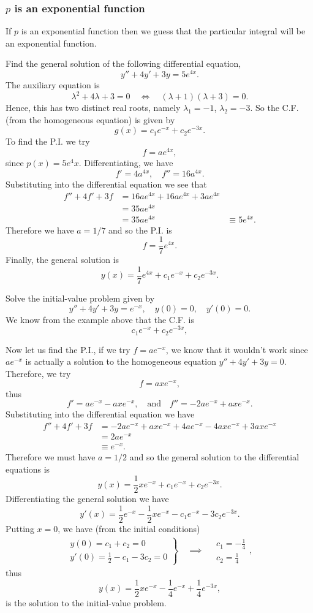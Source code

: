 \subsubsection{$p$ is an exponential function}
If $p$ is an exponential function then we guess that the particular integral will be an exponential function.
\begin{example}
Find the general solution of the following differential equation,
\[y''+4y'+3y=5e^{4x}.\]
The auxiliary equation is
\[\lambda^2+4\lambda+3=0\quad\iff\quad(\lambda+1)(\lambda+3)=0.\]
Hence, this has two distinct real roots, namely $\lambda_1=-1$, $\lambda_2=-3$. So the C.F. (from the homogeneous equation) is given by
\[g(x)=c_1e^{-x}+c_2e^{-3x}.\]
To find the P.I. we try
\[f=ae^{4x},\]
since $p(x)=5e^4x$. Differentiating, we have
\[f'=4a^{4x},\quad f''=16a^{4x}.\]
Substituting into the differential equation we see that
\begin{align*}
f''+4f'+3f&=16ae^{4x}+16ae^{4x}+3ae^{4x}\\
&=35ae^{4x}\\
&=35ae^{4x}&\equiv 5e^{4x}.
\end{align*}
Therefore we have $a=1/7$ and so the P.I. is
\[f=\frac17e^{4x}.\]
Finally, the general solution is
\[y(x)=\frac17e^{4x}+c_1e^{-x}+c_2e^{-3x}.\]
\end{example}

\begin{example}
Solve the initial-value problem given by
\[y''+4y'+3y=e^{-x},\quad y(0)=0,\quad y'(0)=0.\]
We know from the example above that the C.F. is 
\[c_1e^{-x}+c_2e^{-3x},\]

Now let us find the P.I., if we try $f=ae^{-x}$, we know that it wouldn't work since $ae^{-x}$ is actually a solution to the homogeneous equation $y''+4y'+3y=0$. Therefore, we try 
\[f=axe^{-x},\]
thus
\[f'=ae^{-x}-axe^{-x},\quad \text{and}\quad f''=-2ae^{-x}+axe^{-x}.\]
Substituting into the differential equation we have
\begin{align*}
f''+4f'+3f &= -2ae^{-x}+axe^{-x}+4ae^{-x}-4axe^{-x}+3axe^{-x} \\
&= 2ae^{-x}\\
&\equiv e^{-x}.
\end{align*}
Therefore we must have $a=1/2$ and so the general solution to the differential equations is
\[y(x)=\frac{1}{2}xe^{-x}+c_1e^{-x}+c_2e^{-3x}.\]
Differentiating the general solution we have
\[y'(x)=\frac{1}{2}e^{-x}-\frac{1}{2}xe^{-x}-c_1e^{-x}-3c_2e^{-3x}.\]
Putting $x=0$, we have (from the initial conditions)
\begin{align*}
    \left. \begin{array}{l}
	y(0)=c_1+c_2=0 \\
	y'(0)=\frac{1}{2}-c_1-3c_2=0
    \end{array}\right\}
    \quad \implies \quad
        \left. \begin{array}{l}
	c_1=-\frac{1}{4} \\
	c_2=\frac{1}{4}
    \end{array}\right.,
\end{align*}
thus
\[y(x)=\frac{1}{2}xe^{-x}-\frac{1}{4}e^{-x}+\frac{1}{4}e^{-3x},\]
is the solution to the initial-value problem.
\end{example}

